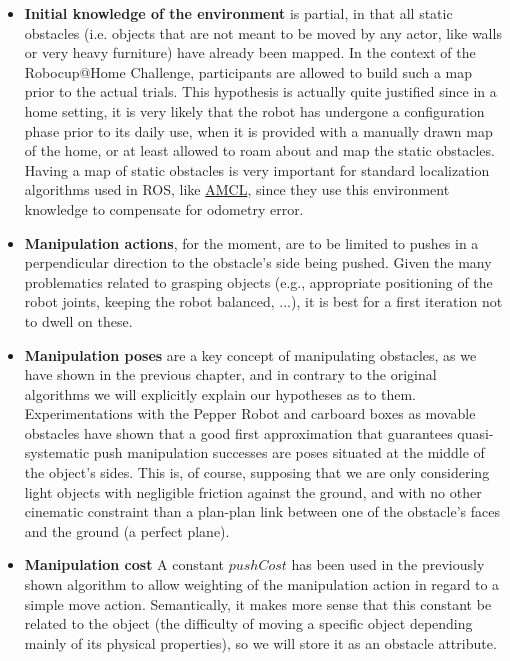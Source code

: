 \begin{itemize}
  \item \textbf{Initial knowledge of the environment} is partial, in that all static obstacles (i.e. objects that are not meant to be moved by any actor, like walls or very heavy furniture) have already been mapped. In the context of the Robocup@Home Challenge, participants are allowed to build such a map prior to the actual trials. This hypothesis is actually quite justified since in a home setting, it is very likely that the robot has undergone a configuration phase prior to its daily use, when it is provided with a manually drawn map of the home, or at least allowed to roam about and map the static obstacles. Having a map of static obstacles is very important for standard localization algorithms used in ROS, like \href{http://wiki.ros.org/amcl}{AMCL}, since they use this environment knowledge to compensate for odometry error.
  \item \textbf{Manipulation actions}, for the moment, are to be limited to pushes in a perpendicular direction to the obstacle's side being pushed. Given the many problematics related to grasping objects (e.g., appropriate positioning of the robot joints, keeping the robot balanced, ...), it is best for a first iteration not to dwell on these.
  \item \textbf{Manipulation poses} are a key concept of manipulating obstacles, as we have shown in the previous chapter, and in contrary to the original algorithms we will explicitly explain our hypotheses as to them. Experimentations with the Pepper Robot and carboard boxes as movable obstacles have shown that a good first approximation that guarantees quasi-systematic push manipulation successes are poses situated at the middle of the object's sides. This is, of course, supposing that we are only considering light objects with negligible friction against the ground, and with no other cinematic constraint than a plan-plan link between one of the obstacle's faces and the ground (a perfect plane).
  \item \textbf{Manipulation cost} A constant $pushCost$ has been used in the previously shown algorithm to allow weighting of the manipulation action in regard to a simple move action. Semantically, it makes more sense that this constant be related to the object (the difficulty of moving a specific object depending mainly of its physical properties), so we will store it as an obstacle attribute.

\end{itemize}
